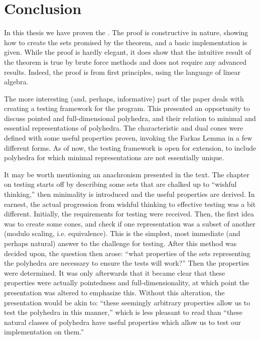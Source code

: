 \chapter*{Conclusion}

In this thesis we have proven the \MWT.  The proof is constructive in nature, showing how to create the sets promised by the theorem, and a basic implementation is given.  While the proof is hardly elegant, it does show that the intuitive result of the theorem is true by brute force methods and does not require any advanced results.  Indeed, the proof is from first principles, using the language of linear algebra.

The more interesting (and, perhaps, informative) part of the paper deals with creating a testing framework for the program.  This presented an opportunity to discuss pointed and full-dimensional polyhedra, and their relation to minimal and essential representations of polyhedra.  The characteristic and dual cones were defined with some useful properties proven, invoking the Farkas Lemma in a few different forms.  As of now, the testing framework is open for extension, to include polyhedra for which minimal representations are not essentially unique.

It may be worth mentioning an anachronism presented in the text.  The chapter on testing starts off by describing some sets that are chalked up to ``wishful thinking,'' then minimality is introduced and the useful properties are derived.  In earnest, the actual progression from wishful thinking to effective testing was a bit different.  Initially, the requirements for testing were received.  Then, the first idea was to create some cones, and check if one representation was a subset of another (modulo scaling, i.e. equivalence).  This is the simplest, most immediate (and perhaps natural) answer to the challenge for testing.  After this method was decided upon, the question then arose: ``what properties of the sets representing the polyhedra are necessary to ensure the tests will work?''  Then the properties were determined.  It was only afterwards that it became clear that these properties were actually pointedness and full-dimensionality, at which point the presentation was altered to emphasize this.  Without this alteration, the presentation would be akin to: ``these seemingly arbitrary properties allow us to test the polyhedra in this manner,'' which is less pleasant to read than ``these natural classes of polyhedra have useful properties which allow us to test our implementation on them.''

